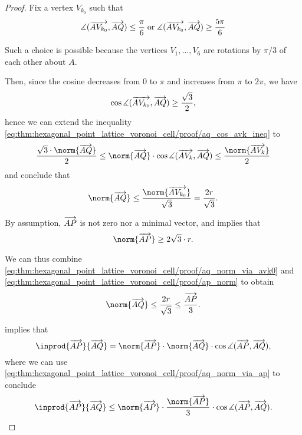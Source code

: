 \begin{proof}
  Fix a vertex \( V_{k_0} \) such that
  \begin{equation*}
    \measuredangle(\vect{AV_{k_0}}, \vect{AQ}) \leq \frac \pi 6 \T{or} \measuredangle(\vect{AV_{k_0}}, \vect{AQ}) \geq \frac {5\pi} 6
  \end{equation*}

  Such a choice is possible because the vertices \( V_1, \ldots, V_6 \) are rotations by \( \pi / 3 \) of each other about \( A \).

  Then, since the cosine decreases from \( 0 \) to \( \pi \) and increases from \( \pi \) to \( 2\pi \), we have
  \begin{equation*}
    \cos \measuredangle(\overrightarrow{AV_{k_0}}, \overrightarrow{AQ}) \geq \frac {\sqrt 3} 2,
  \end{equation*}
  hence we can extend the inequality \eqref{eq:thm:hexagonal_point_lattice_voronoi_cell/proof/aq_cos_avk_ineq} to
  \begin{equation*}
    \frac {\sqrt 3 \cdot \norm{\vect{AQ}}} 2 \leq \norm{\vect{AQ}} \cdot \cos\measuredangle(\vect{AV_k}, \vect{AQ}) \leq \frac {\norm{\vect{AV_k}}} 2
  \end{equation*}
  and conclude that
  \begin{equation}\label{eq:thm:hexagonal_point_lattice_voronoi_cell/proof/aq_norm_via_avk0}
    \norm{\vect{AQ}} \leq \frac {\norm{\vect{AV_{k_0}}}} {\sqrt 3} = \frac {2r} {\sqrt 3}.
  \end{equation}

  By assumption, \( \overrightarrow{AP} \) is not zero nor a minimal vector, and  implies that
  \begin{equation}\label{eq:thm:hexagonal_point_lattice_voronoi_cell/proof/ap_norm}
    \norm{\vect{AP}} \geq 2 \sqrt 3 \cdot r.
  \end{equation}

  We can thus combine \eqref{eq:thm:hexagonal_point_lattice_voronoi_cell/proof/aq_norm_via_avk0} and \eqref{eq:thm:hexagonal_point_lattice_voronoi_cell/proof/ap_norm} to obtain
  \begin{equation}\label{eq:thm:hexagonal_point_lattice_voronoi_cell/proof/aq_norm_via_ap}
    \norm{\vect{AQ}} \leq \frac {2r} {\sqrt 3} \leq \frac {\vect{AP}} 3.
  \end{equation}

   implies that
  \begin{equation*}
    \inprod {\vect{AP}} {\vect{AQ}}
    =
    \norm{\vect{AP}} \cdot \norm{\vect{AQ}} \cdot \cos\measuredangle(\vect{AP}, \vect{AQ}),
  \end{equation*}
  where we can use \eqref{eq:thm:hexagonal_point_lattice_voronoi_cell/proof/aq_norm_via_ap} to conclude
  \begin{equation*}
    \inprod {\vect{AP}} {\vect{AQ}}
    \leq
    \norm{\vect{AP}} \cdot \frac {\norm{\vect{AP}}} 3 \cdot \cos\measuredangle(\vect{AP}, \vect{AQ}).
  \end{equation*}


\end{proof}
